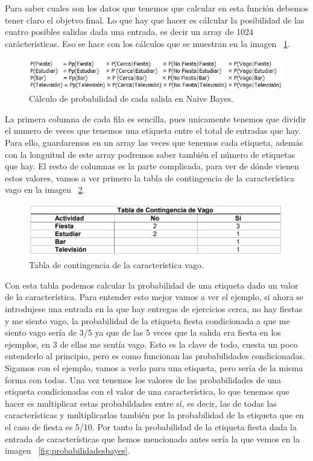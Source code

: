 \documentclass[a4paper, 12pt]{book}
\begin{document}
Para saber cuales son los datos que tenemos que calcular en esta función debemos tener claro el objetvo final. Lo que hay que hacer es cálcular la posibilidad de las cuatro posibles salidas dada una entrada, es decir un array de 1024 carácteristicas. Eso se hace con los cálculos que se muestran en la imagen ~\ref{fig:probabilidadbayes}. 

\begin{figure}
	\centering
	\includegraphics[width=12cm, keepaspectratio]{img/probabilidadbayes}
	\caption{Cálculo de probabilidad de cada salida en Naive Bayes.}			
	\label{fig:probabilidadbayes}
\end{figure}

La primera columna de cada fila es sencilla, pues unicamente tenemos que dividir el numero de veces que tenemos una etiqueta entre el total de entradas que hay. Para ello, guardaremos en un array las veces que tenemos cada etiqueta, además con la longuitud de este array podremos saber también el número de etiquetas que hay. 
El resto de columnas es la parte complicada, para ver de dónde vienen estos valores, vamos a ver primero la tabla de contingencia de la característica vago en la imagen ~\ref{fig:tablavago}. 

\begin{figure}
	\centering
	\includegraphics[width=12cm, keepaspectratio]{img/tablavago}
	\caption{Tabla de contingencia de la característica vago.}			
	\label{fig:tablavago}
\end{figure}

Con esta tabla podemos calcular la probabilidad de una etiqueta dado un valor de la característica. Para entender esto mejor vamos a ver el ejemplo, si ahora se introdujese una entrada en la que hay entregas de ejercicios cerca, no hay fiestas y me siento vago, la probabilidad de la etiqueta fiesta condicionada a que me siento vago sería de 3/5 ya que de las 5 veces que la salida era fiesta en los ejemplos, en 3 de ellas me sentía vago. Esto es la clave de todo, cuesta un poco entenderlo al principio, pero es como funcionan las probabilidades condicionadas.\\
Sigamos con el ejemplo, vamos a verlo para una etiqueta, pero sería de la misma forma con todas. Una vez tenemos los valores de las probabilidades de una etiqueta condicionadas con el valor de una característica, lo que tenemos que hacer es multiplicar estas probabildades entre sí, es decir, las de todas las características y multiplicarlas también por la probabilidad de la etiqueta que en el caso de fiesta es 5/10. Por tanto la probabilidad de la etiqueta fiesta dada la entrada de características que hemos mencionado antes sería la que vemos en la imagen ~\ref{fig:probabilidadesbayes}. 
\end{document}
